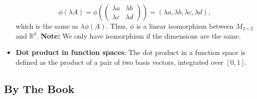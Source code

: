 \documentclass{report}
\begin{document}
\begin{itemize}
\begin{itemize}
            \end{itemize}
            \[
                \phi(\lambda A) = \phi\left(\begin{pmatrix} \lambda a & \lambda b \\ \lambda c & \lambda d \end{pmatrix}\right) = (\lambda a, \lambda b, \lambda c, \lambda d),
            \]
            \bigbreak \noindent 
            which is the same as $\lambda \phi(A)$.
            \bigbreak \noindent 
            Thus, $\phi$ is a linear isomorphism between $M_{2 \times 2}$ and $\mathbb{R}^4$.
            \bigbreak \noindent 
            \textbf{Note:} We only have isomorphism if the dimensions are the same.
        \item \textbf{Dot product in function spaces}: The dot product in a function space is defined as the product of a pair of two basis vectors, integrated over $[0,1]$.



    \end{itemize}

    \pagebreak 
    \subsection{By The Book}
    \begin{itemize}
        
    \end{itemize}

    \pagebreak 
\end{document}
